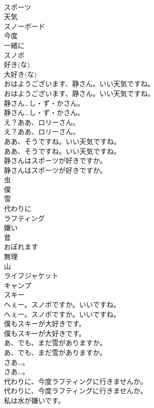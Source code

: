 \documentclass[8pt]{extreport}
\begin{document}
\begin{CJK}{UTF8}{min}
\\	スポーツ
\\	天気
\\	スノーボード
\\	今度
\\	一緒に
\\	スノボ
\\	好き(な)
\\	大好き(な)
\\	おはようございます、静さん。いい天気ですね。	
\\	おはようございます、静さん。いい天気ですね。 
\\	静さん…し・ず・かさん。	
\\	静さん…し・ず・かさん。 
\\	え？ああ、ロリーさん。	
\\	え？ああ、ロリーさん。 
\\	ああ、そうですね。いい天気ですね。	
\\	ああ、そうですね。いい天気ですね。 
\\	静さんはスポーツが好きですか。	
\\	静さんはスポーツが好きですか。 
\\	虫
\\	僕
\\	雪
\\	代わりに
\\	ラフティング
\\	嫌い
\\	昔
\\	おぼれます
\\	無理
\\	山
\\	ライフジャケット
\\	キャンプ
\\	スキー
\\	へぇー。スノボですか。いいですね。	
\\	へぇー。スノボですか。いいですね。 
\\	僕もスキーが大好きです。	
\\	僕もスキーが大好きです。 
\\	あ、でも、まだ雪がありますか。	
\\	あ、でも、まだ雪がありますか。 
\\	さあ…。	
\\	さあ…。 
\\	代わりに、今度ラフティングに行きませんか。	
\\	代わりに、今度ラフティングに行きませんか。 
\\	私は水が嫌いです。	

\end{CJK}
\end{document}
